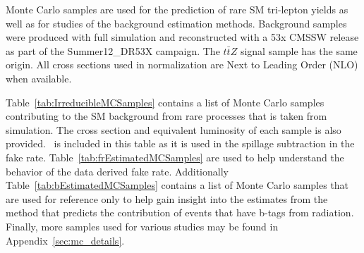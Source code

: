 Monte Carlo samples are used for the prediction of rare SM tri-lepton yields as well as for studies of the background estimation methods.  
Background samples were produced with full simulation and reconstructed with a 53x CMSSW release as part of the Summer12\_DR53X campaign.
The $t\bar{t}Z$ signal sample has the same origin.    
All cross sections used in normalization are Next to Leading Order (NLO) when available.

Table~\ref{tab:IrreducibleMCSamples} contains a list of Monte Carlo samples contributing to the SM background from rare processes that is taken from simulation.  The cross section and equivalent luminosity of each sample is also provided. \ttZ \ is included in this table as it is used in the spillage subtraction in the fake rate. Table~\ref{tab:frEstimatedMCSamples} are used to help understand the behavior of the data derived fake rate. Additionally Table~\ref{tab:bEstimatedMCSamples} contains a list of Monte Carlo samples that are used for reference only to help gain insight into  the estimates from the method that predicts the contribution of events that have b-tags from radiation. Finally, more samples used for various studies may be found in Appendix~\ref{sec:mc_details}.\\

